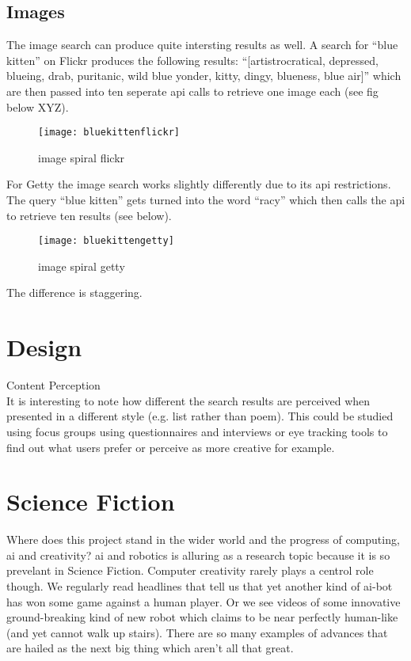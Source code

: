 {\subsection{Images}

The image search can produce quite intersting results as well. A search for ``blue kitten'' on Flickr produces the following results: ``[artistrocratical, depressed, blueing, drab, puritanic, wild blue yonder, kitty, dingy, blueness, blue air]'' which are then passed into ten seperate \gls{api} calls to retrieve one image each (see fig below XYZ).

\begin{figure}[h!]
\centering
  \texttt{[image: bluekittenflickr]}
\caption[image spiral flickr]{image spiral flickr}
\label{fig:imgspiralflickr}
\end{figure}

For Getty the image search works slightly differently due to its \gls{api} restrictions. The query ``blue kitten'' gets turned into the word ``racy'' which then calls the \gls{api} to retrieve ten results (see below).

\begin{figure}[h!]
\centering
  \texttt{[image: bluekittengetty]}
\caption[image spiral getty]{image spiral getty}
\label{fig:imgspiralgetty}
\end{figure}

The difference is staggering.




\section{Design}

Content Perception\\
It is interesting to note how different the search results are perceived when presented in a different style (e.g. list rather than poem). This could be studied using focus groups using questionnaires and interviews or eye tracking tools to find out what users prefer or perceive as more creative for example.




\section{Science Fiction}

Where does this project stand in the wider world and the progress of computing, \gls{ai} and creativity? \gls{ai} and robotics is alluring as a research topic because it is so prevelant in Science Fiction. Computer creativity rarely plays a centrol role though. We regularly read headlines that tell us that yet another kind of \gls{ai}-bot has won some game against a human player. Or we see videos of some innovative ground-breaking kind of new robot which claims to be near perfectly human-like (and yet cannot walk up stairs). There are so many examples of advances that are hailed as the next big thing which aren't all that great. 

}
